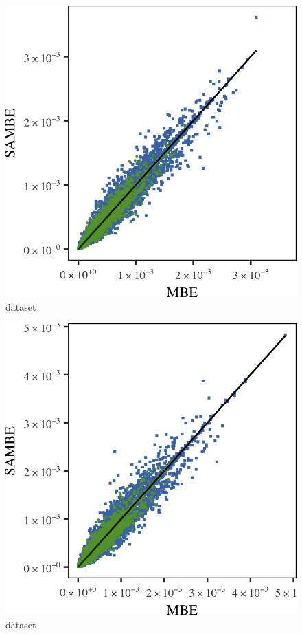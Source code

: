 \begin{subfigure}{0.23\textwidth}
	\centering
	\includegraphics[keepaspectratio=true, width=\textwidth, height=0.23\textheight]{discussion/img/baakman_4_60000_mbe_sambe}
	\caption{dataset \baakmanFour}
	\label{fig:discussion:singlesphere:mbevssambe:baakman4}
\end{subfigure}	
\begin{subfigure}{0.23\textwidth}
	\centering
	\includegraphics[keepaspectratio=true, width=\textwidth, height=0.23\textheight]{discussion/img/baakman_5_60000_mbe_sambe}
	\caption{dataset \baakmanFive}
	\label{fig:discussion:singlesphere:mbevssambe:baakman5}
\end{subfigure}